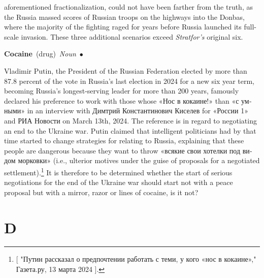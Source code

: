 \documentclass[10pt,a4paper,twoside]{article} %
\newcommand{\entry}[4]{\markboth{#1}{#1}\textbf{#1}\ {(#2)}\ \textit{#3}\ $\bullet$\ {#4}}  %
\begin{document}
\begin{multicols}{2}
{aforementioned fractionalization, could not have been farther from the truth, as the Russia massed scores of Russian troops on the highways into the Donbas, where the majority of the fighting raged for years before Russia launched its full-scale invasion. These three additional scenarios exceed \emph{Stratfor's} original six. 

}

\entry{Cocaine} {drug} {Noun} {Vladimir Putin, the President of the Russian Federation elected by more than 87.8 percent of the vote in Russia's last election in 2024 for a new six year term, becoming Russia's longest-serving leader for more than 200 years, famously declared his preference to work with those whose \textrussian{«Нос в кокаине!»} than \textrussian{«с умными»} in an interview with \textrussian{Димтрий Константинович Киселев} for \textrussian{«России 1»} and \textrussian{РИА Новости} on March 13th, 2024. The reference is in regard to negotiating an end to the Ukraine war. 
\newline \indent Putin claimed that intelligent politicians had by that time started to change strategies for relating to Russia, explaining that these people are dangerous because they want to throw \textrussian{«всякие свои хотелки под видом морковки»} (i.e., ulterior motives under the guise of proposals for a negotiated settlement).\footnote{ [ \textrussian{"Путин рассказал о предпочтении работать с теми, у кого «нос в кокаине»," Газета.ру,  13 марта 2024} ]. } It is therefore to be determined whether the start of serious negotiations for the end of the Ukraine war should start not with a peace proposal but with a mirror, razor or lines of cocaine, is it not? 

}


\end{multicols}



\section*{D}
\end{document}

